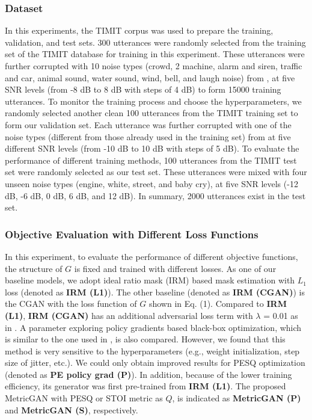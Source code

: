 \documentclass{article}
\begin{document}
\subsubsection{Dataset}
In this experiments, the TIMIT corpus \cite{garofolo1988getting} was used to prepare the training, validation, and test sets. 300 utterances were randomly selected from the training set of the TIMIT database for training in this experiment. These utterances were further corrupted with 10 noise types (crowd, 2 machine, alarm and siren, traffic and car, animal sound, water sound, wind, bell, and laugh noise) from \cite{hu100}, at five SNR levels (from -8 dB to 8 dB with steps of 4 dB) to form 15000 training utterances. To monitor the training process and choose the hyperparameters, we randomly selected another clean 100 utterances from the TIMIT training set to form our validation set. Each utterance was further corrupted with one of the noise types (different from those already used in the training set) from \cite{hu100} at five different SNR levels (from -10 dB to 10 dB with steps of 5 dB). To evaluate the performance of different training methods, 100 utterances from the TIMIT test set were randomly selected as our test set. These utterances were mixed with four unseen noise types (engine, white, street, and baby cry), at five SNR levels (-12 dB, -6 dB, 0 dB, 6 dB, and 12 dB). In summary, 2000 utterances exist in the test set.



\subsubsection{Objective Evaluation with Different Loss Functions}
In this experiment, to evaluate the performance of different objective functions, the structure of $G$ is fixed and trained with different losses. As one of our baseline models, we adopt ideal ratio mask (IRM) \cite{narayanan2013ideal} based mask estimation with $L_{1}$ loss (denoted as \textbf{IRM (L1)}). The other baseline (denoted as \textbf{IRM (CGAN)}) is the CGAN with the loss function of $G$ shown in Eq. (1). Compared to \textbf{IRM (L1)}, \textbf{IRM (CGAN)} has an additional adversarial loss term with $\lambda$ = 0.01 as in \cite{bagchi2018spectral,pascual2017segan}. A parameter exploring policy gradients \cite{sehnke2010parameter} based black-box optimization, which is similar to the one used in \cite{zhang2018training}, is also compared. However, we found that this method is very sensitive to the hyperparameters (e.g., weight initialization, step size of jitter, etc.). We could only obtain improved results for PESQ optimization (denoted as \textbf{PE policy grad (P)}). In addition, because of the lower training efficiency, its generator was first pre-trained from \textbf{IRM (L1)}. The proposed MetricGAN with PESQ or STOI metric as $Q$, is indicated as \textbf{MetricGAN (P)} and \textbf{MetricGAN (S)}, respectively.
\end{document}
